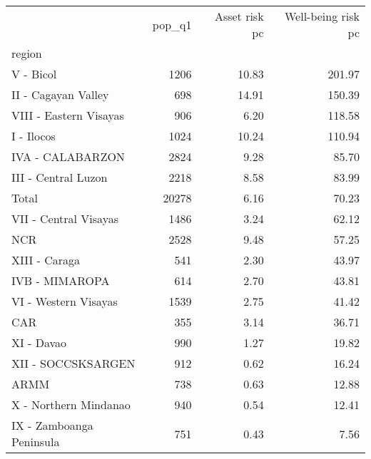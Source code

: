 \begin{tabular}{lrrr}
\toprule
{} &  pop\_q1 &  Asset risk pc &  Well-being risk pc \\
region                   &         &                &                     \\
\midrule
V - Bicol                &    1206 &          10.83 &              201.97 \\
II - Cagayan Valley      &     698 &          14.91 &              150.39 \\
VIII - Eastern Visayas   &     906 &           6.20 &              118.58 \\
I - Ilocos               &    1024 &          10.24 &              110.94 \\
IVA - CALABARZON         &    2824 &           9.28 &               85.70 \\
III - Central Luzon      &    2218 &           8.58 &               83.99 \\
Total                    &   20278 &           6.16 &               70.23 \\
VII - Central Visayas    &    1486 &           3.24 &               62.12 \\
NCR                      &    2528 &           9.48 &               57.25 \\
XIII - Caraga            &     541 &           2.30 &               43.97 \\
IVB - MIMAROPA           &     614 &           2.70 &               43.81 \\
VI - Western Visayas     &    1539 &           2.75 &               41.42 \\
CAR                      &     355 &           3.14 &               36.71 \\
XI - Davao               &     990 &           1.27 &               19.82 \\
XII - SOCCSKSARGEN       &     912 &           0.62 &               16.24 \\
ARMM                     &     738 &           0.63 &               12.88 \\
X - Northern Mindanao    &     940 &           0.54 &               12.41 \\
IX - Zamboanga Peninsula &     751 &           0.43 &                7.56 \\
\bottomrule
\end{tabular}

